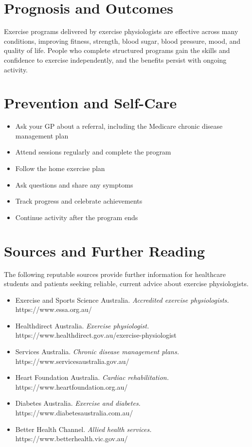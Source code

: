 \section*{Prognosis and Outcomes}
Exercise programs delivered by exercise physiologists are effective across many conditions, improving fitness, strength, blood sugar, blood pressure, mood, and quality of life. People who complete structured programs gain the skills and confidence to exercise independently, and the benefits persist with ongoing activity.

\section*{Prevention and Self-Care}
\begin{itemize}
    \item Ask your GP about a referral, including the Medicare chronic disease management plan
    \item Attend sessions regularly and complete the program
    \item Follow the home exercise plan
    \item Ask questions and share any symptoms
    \item Track progress and celebrate achievements
    \item Continue activity after the program ends
\end{itemize}

\section*{Sources and Further Reading}
The following reputable sources provide further information for healthcare students and patients seeking reliable, current advice about exercise physiologists.
\begin{itemize}
    \item Exercise and Sports Science Australia. \textit{Accredited exercise physiologists.} https://www.essa.org.au/
    \item Healthdirect Australia. \textit{Exercise physiologist.} https://www.healthdirect.gov.au/exercise-physiologist
    \item Services Australia. \textit{Chronic disease management plans.} https://www.servicesaustralia.gov.au/
    \item Heart Foundation Australia. \textit{Cardiac rehabilitation.} https://www.heartfoundation.org.au/
    \item Diabetes Australia. \textit{Exercise and diabetes.} https://www.diabetesaustralia.com.au/
    \item Better Health Channel. \textit{Allied health services.} https://www.betterhealth.vic.gov.au/
\end{itemize}
